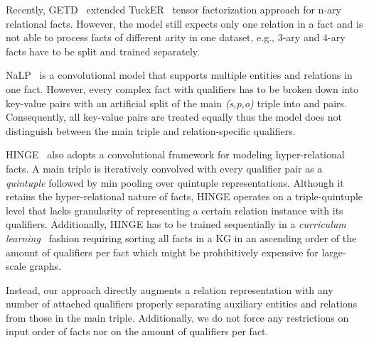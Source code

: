 \documentclass[11pt,a4paper]{article}
\begin{document}
Recently, GETD~\citep{10.1145/3366423.3380188} extended TuckER~\citep{DBLP:conf/emnlp/BalazevicAH19} tensor factorization approach for n-ary relational facts. 
However, the model still expects only one relation in a fact and is not able to process facts of different arity in one dataset, e.g., 3-ary and 4-ary facts have to be split and trained separately. 

NaLP~\citep{DBLP:conf/www/GuanJWC19} is a convolutional model that supports multiple entities and relations in one fact. 
However, every complex fact with  qualifiers has to be broken down into  key-value pairs with an artificial split of the main \emph{(s,p,o)} triple into  and  pairs. 
Consequently, all key-value pairs are treated equally thus the model does not distinguish between the main triple and relation-specific qualifiers. 

HINGE~\citep{10.1145/3366423.3380257} also adopts a convolutional framework for modeling hyper-relational facts. A main triple is iteratively convolved with every qualifier pair as a \emph{quintuple} followed by min pooling over quintuple representations. 
Although it retains the hyper-relational nature of facts, HINGE operates on a triple-quintuple level that  lacks granularity of representing a certain relation instance with its qualifiers.
Additionally, HINGE has to be trained sequentially in a \emph{curriculum learning}~\citep{10.1145/1553374.1553380} fashion requiring sorting all facts in a KG in an ascending order of the amount of qualifiers per fact which might be prohibitively expensive for large-scale graphs.

Instead, our approach directly augments a relation representation with any number of attached qualifiers properly separating auxiliary entities and relations from those in the main triple.
Additionally, we do not force any restrictions on input order of facts nor on the amount of qualifiers per fact.
\end{document}
